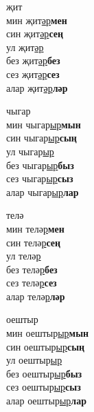 \begin{multicols}{4}
\begin{enumerate}
\begin{minipage}{\linewidth}
    \item
    җит\\
    мин җит\underline{әр}\textbf{мен}\\
    син җит\underline{әр}\textbf{сең}\\
    ул җит\underline{әр}\\
    без җит\underline{әр}\textbf{без}\\
    сез җит\underline{әр}\textbf{сез}\\
    алар җит\underline{әр}\textbf{ләр}\\
\end{minipage}

\begin{minipage}{\linewidth}
    \item
    чыгар\\
    мин чыгар\underline{ыр}\textbf{мын}\\
    син чыгар\underline{ыр}\textbf{сың}\\
    ул чыгар\underline{ыр}\\
    без чыгар\underline{ыр}\textbf{быз}\\
    сез чыгар\underline{ыр}\textbf{сыз}\\
    алар чыгар\underline{ыр}\textbf{лар}\\
\end{minipage}

\begin{minipage}{\linewidth}
    \item
    телә\\
    мин телә\underline{р}\textbf{мен}\\
    син телә\underline{р}\textbf{сең}\\
    ул телә\underline{р}\\
    без телә\underline{р}\textbf{без}\\
    сез телә\underline{р}\textbf{сез}\\
    алар телә\underline{р}\textbf{ләр}\\
\end{minipage}

\begin{minipage}{\linewidth}
    \item
    оештыр\\
    мин оештыр\underline{ыр}\textbf{мын}\\
    син оештыр\underline{ыр}\textbf{сың}\\
    ул оештыр\underline{ыр}\\
    без оештыр\underline{ыр}\textbf{быз}\\
    сез оештыр\underline{ыр}\textbf{сыз}\\
    алар оештыр\underline{ыр}\textbf{лар}\\
\end{minipage}


\end{enumerate}
\end{multicols}
